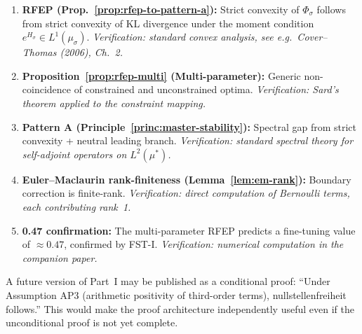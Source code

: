 \documentclass[12pt,a4paper]{article}
\theoremstyle{definition}
\theoremstyle{remark}
\begin{document}
\begin{enumerate}
\item \textbf{RFEP (Prop.~\ref{prop:rfep-to-pattern-a}):} Strict convexity of $\Phi_\sigma$ follows from strict convexity of KL divergence under the moment condition $e^{H_\sigma} \in L^1(\mu_\sigma)$. \emph{Verification: standard convex analysis, see e.g.\ Cover--Thomas (2006), Ch.~2.}

\item \textbf{Proposition~\ref{prop:rfep-multi} (Multi-parameter):} Generic non-coincidence of constrained and unconstrained optima. \emph{Verification: Sard's theorem applied to the constraint mapping.}

\item \textbf{Pattern A (Principle~\ref{princ:master-stability}):} Spectral gap from strict convexity + neutral leading branch. \emph{Verification: standard spectral theory for self-adjoint operators on $L^2(\mu^*)$.}

\item \textbf{Euler--Maclaurin rank-finiteness (Lemma~\ref{lem:em-rank}):} Boundary correction is finite-rank. \emph{Verification: direct computation of Bernoulli terms, each contributing rank~1.}

\item \textbf{0.47 confirmation:} The multi-parameter RFEP predicts a fine-tuning value of $\approx 0.47$, confirmed by FST-I. \emph{Verification: numerical computation in the companion paper.}
\end{enumerate}

\noindent
A future version of Part~I may be published as a conditional proof: ``Under Assumption AP3 (arithmetic positivity of third-order terms), nullstellenfreiheit follows.'' This would make the proof architecture independently useful even if the unconditional proof is not yet complete.
\end{document}
